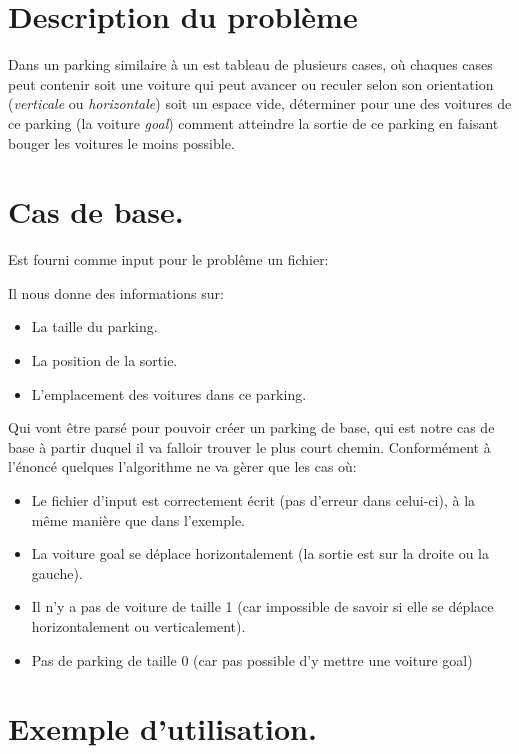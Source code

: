 \documentclass[10pt, a4paper]{article}
\begin{document}
\section{Description du problème}
    Dans un parking similaire à un est tableau de plusieurs cases,
    où chaques cases peut contenir soit une voiture qui peut avancer
    ou reculer selon son orientation (\emph{verticale} ou \emph{horizontale})
    soit un espace vide, déterminer pour une des voitures de ce parking
    (la voiture \emph{goal}) comment atteindre la sortie de ce parking en
    faisant bouger les voitures le moins possible.

\section{Cas de base.}
    Est fourni comme input pour le problême un fichier: \newline
    
    Il nous donne des informations sur:
    \begin{itemize}
        \item La taille du parking.
        \item La position de la sortie.
        \item L'emplacement des voitures dans ce parking.
    \end{itemize}
    Qui vont être parsé pour pouvoir créer un parking de base, qui est notre
    cas de base à partir duquel il va falloir trouver le plus court
    chemin.\newline
    Conformément à l'énoncé quelques l'algorithme ne va gèrer que les cas où:
    \begin{itemize}
        \item Le fichier d'input est correctement écrit (pas d'erreur dans
            celui-ci), à la même manière que dans l'exemple.
        \item La voiture goal se déplace horizontalement (la sortie est sur la
            droite ou la gauche).
        \item Il n'y a pas de voiture de taille 1 (car impossible de savoir si
            elle se déplace horizontalement ou verticalement).
        \item Pas de parking de taille 0 (car pas possible d'y mettre une
            voiture goal)
    \end{itemize}

\section{Exemple d'utilisation.}
\end{document}
